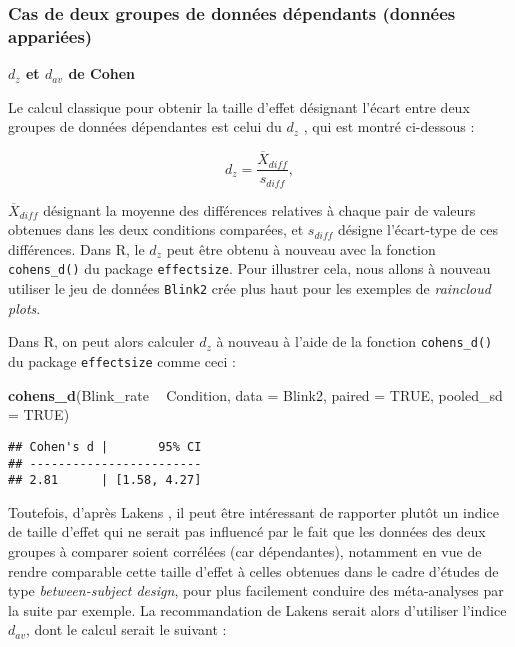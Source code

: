 \documentclass[
  french,
]{book}
\newenvironment{Shaded}{\begin{snugshade}}{\end{snugshade}}
\newcommand{\DataTypeTok}[1]{\textcolor[rgb]{0.13,0.29,0.53}{#1}}
\newcommand{\KeywordTok}[1]{\textcolor[rgb]{0.13,0.29,0.53}{\textbf{#1}}}
\newcommand{\NormalTok}[1]{#1}
\newcommand{\OperatorTok}[1]{\textcolor[rgb]{0.81,0.36,0.00}{\textbf{#1}}}
\newcommand{\OtherTok}[1]{\textcolor[rgb]{0.56,0.35,0.01}{#1}}
\newcommand{\StringTok}[1]{\textcolor[rgb]{0.31,0.60,0.02}{#1}}
\begin{document}
\hypertarget{cas-de-deux-groupes-de-donnuxe9es-duxe9pendants-donnuxe9es-appariuxe9es}{%
\subsubsection{Cas de deux groupes de données dépendants (données appariées)}\label{cas-de-deux-groupes-de-donnuxe9es-duxe9pendants-donnuxe9es-appariuxe9es}}

\textbf{\(d_{z}\) et \(d_{av}\) de Cohen}

Le calcul classique pour obtenir la taille d'effet désignant l'écart entre deux groupes de données dépendantes est celui du \(d_{z}\) \autocite{lakensCalculatingReportingEffect2013}, qui est montré ci-dessous :

\[d_{z} = \frac{\overline{X} _{diff}}{s_{diff}},\]

\(\overline{X} _{diff}\) désignant la moyenne des différences relatives à chaque pair de valeurs obtenues dans les deux conditions comparées, et \(s_{diff}\) désigne l'écart-type de ces différences. Dans R, le \(d_{z}\) peut être obtenu à nouveau avec la fonction \texttt{cohens\_d()} du package \texttt{effectsize}. Pour illustrer cela, nous allons à nouveau utiliser le jeu de données \texttt{Blink2} crée plus haut pour les exemples de \emph{raincloud plots}.

Dans R, on peut alors calculer \(d_{z}\) à nouveau à l'aide de la fonction \texttt{cohens\_d()} du package \texttt{effectsize} comme ceci :

\begin{Shaded}
\begin{Highlighting}[]
\KeywordTok{cohens_d}\NormalTok{(Blink_rate }\OperatorTok{~}\StringTok{ }\NormalTok{Condition, }\DataTypeTok{data =}\NormalTok{ Blink2, }\DataTypeTok{paired =} \OtherTok{TRUE}\NormalTok{, }\DataTypeTok{pooled_sd =} \OtherTok{TRUE}\NormalTok{)}
\end{Highlighting}
\end{Shaded}

\begin{verbatim}
## Cohen's d |       95% CI
## ------------------------
## 2.81      | [1.58, 4.27]
\end{verbatim}

Toutefois, d'après Lakens \autocite*{lakensCalculatingReportingEffect2013}, il peut être intéressant de rapporter plutôt un indice de taille d'effet qui ne serait pas influencé par le fait que les données des deux groupes à comparer soient corrélées (car dépendantes), notamment en vue de rendre comparable cette taille d'effet à celles obtenues dans le cadre d'études de type \emph{between-subject design}, pour plus facilement conduire des méta-analyses par la suite par exemple. La recommandation de Lakens \autocite*{lakensCalculatingReportingEffect2013} serait alors d'utiliser l'indice \(d_{av}\), dont le calcul serait le suivant :
\end{document}

